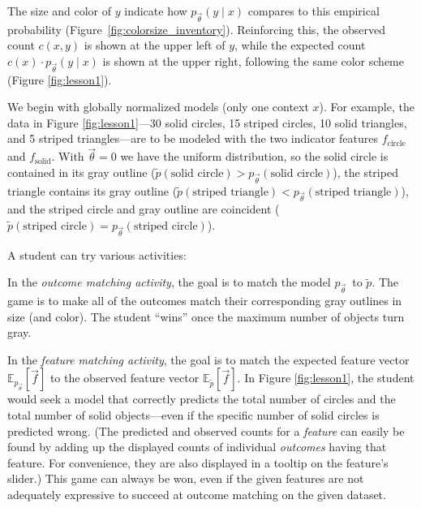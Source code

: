 \documentclass[11pt,letterpaper]{article}
\newcommand{\empirical}[0]{\ensuremath{\tilde{p}}}
\begin{document}
The size and color of $y$  indicate how $p_{\vec{\theta}}(y\mid x)$ compares to 
this empirical probability (Figure~\ref{fig:colorsize_inventory}).  
Reinforcing this, the observed count $c(x,y)$ is shown at the upper
left of $y$, while the expected count $c(x)\cdot p_{\vec{\theta}}(y\mid x)$ 
is shown at the upper right, following the same color 
scheme (Figure \ref{fig:lesson1}).  

We begin with globally normalized models (only one 
context $x$).  For example, the data in Figure \ref{fig:lesson1}---30 solid
circles, 15 striped circles, 10 solid triangles, and 5 striped
triangles---are to be modeled with the two indicator features
$f_{\textrm{circle}}$ and $f_{\textrm{solid}}$. With $\vec{\theta} =
0$ we have the uniform distribution, so the solid circle is contained
in its gray outline ($\empirical{}(\textrm{solid circle}) >
p_{\vec{\theta}}(\textrm{solid circle})$), the striped triangle
contains its gray outline ($\empirical{}(\textrm{striped triangle}) <
p_{\vec{\theta}}(\textrm{striped triangle})$), and the striped
circle and gray outline are coincident ($\empirical{}(\textrm{striped
  circle}) = p_{\vec{\theta}}(\textrm{striped circle})$).

A student can try various activities:

In the \textit{outcome matching activity}, the goal is to match the
model $p_{\vec{\theta}}$\ to $\tilde{p}$.
The game is to make all of the outcomes match their corresponding
gray outlines in size (and color).  The student ``wins'' once the
maximum number of objects turn gray.

In the \textit{feature matching activity}, the goal is to match the
expected feature vector $\mathbb{E}_{p_{\vec{\theta}}}[\vec{f}]$ to
the observed feature vector $\mathbb{E}_{\tilde{p}}[\vec{f}]$.  In
Figure \ref{fig:lesson1}, the student would seek a model that
correctly predicts the total number of circles and the total number of
solid objects---even if the specific number of solid circles is
predicted wrong.  (The predicted and observed counts for a {\em
  feature} can easily be found by adding up the displayed counts of
individual {\em outcomes} having that feature.  For convenience, they
are also displayed in a tooltip on the feature's slider.)  This game
can always be won, even if the given features are not adequately
expressive to succeed at outcome matching on the given dataset.
\end{document}
